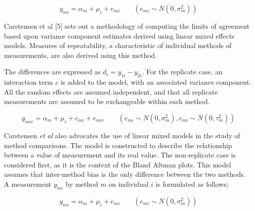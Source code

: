 \documentclass[12pt, a4paper]{report}
\theoremstyle{plain}
\theoremstyle{definition}
\theoremstyle{remark}
\begin{document}
	
	\begin{equation}
	y_{mi}  = \alpha_{m} + \mu_{i} + e_{mi} \qquad ( e_{mi} \sim
	N(0,\sigma^{2}_{m}))
	\end{equation}
	
	
	
	
	Carstensen et al [5] sets out a methodology of computing the limits of
	agreement based upon variance component estimates derived using
	linear mixed effects models. 
	Measures of repeatability, a
	characteristic of individual methods of measurements, are also
	derived using this method.
	
	
	
	
	
	The differences are expressed as $d_{i} = y_{1i} - y_{2i}$.
	For the
	replicate case, an interaction term $c$ is added to the model,
	with an associated variance component. 
	All the random effects are
	assumed independent, and that all replicate measurements are
	assumed to be exchangeable within each method.
	
	
	
	\begin{equation}
	y_{mir}  = \alpha_{m} + \mu_{i} + c_{mi} + e_{mir} \qquad ( e_{mi}
	\sim N(0,\sigma^{2}_{m}), c_{mi} \sim N(0,\tau^{2}_{m}))
	\end{equation}
	
	
	
	Carstensen \textit{et al} \cite{BXC2004} also advocates the use of linear mixed models in
	the study of method comparisons. 
	The model is constructed to
	describe the relationship between a value of measurement and its
	real value.
	The non-replicate case is considered first, as it is
	the context of the Bland Altman plots. This model assumes that
	inter-method bias is the only difference between the two methods.
	A measurement $y_{mi}$ by method $m$ on individual $i$ is
	formulated as follows;
	
	\begin{equation}
	y_{mi}  = \alpha_{m} + \mu_{i} + e_{mi} \qquad ( e_{mi} \sim
	N(0,\sigma^{2}_{m}))
	\end{equation}
	
\end{document}

